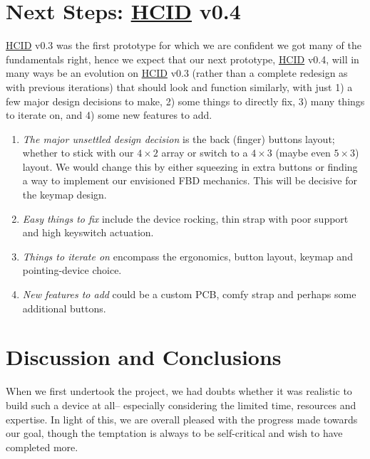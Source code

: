 \documentclass[logo,bsc,singlespacing,parskip]{infthesis}
\begin{document}
\chapter{Next Steps: \hyperref[org0c83164]{HCID} v0.4}
\label{sec:orgf0596d4}
\hyperref[org0c83164]{HCID} v0.3 was the first prototype for which we are confident we got  many of the fundamentals right, hence we expect that our next prototype,  \hyperref[org0c83164]{HCID} v0.4, will in many ways be an evolution on \hyperref[org0c83164]{HCID} v0.3 (rather than a complete redesign as with previous iterations) that should look and function similarly, with just 1) a few major design decisions to make, 2) some things to directly fix, 3) many things to iterate on, and  4) some new features to add.

\begin{enumerate}
\item \emph{The major unsettled design decision} is the back (finger) buttons layout; whether to stick with our \(4\times2\) array or switch to a \(4\times3\) (maybe even \(5\times3\)) layout.
We would change this by either squeezing in extra buttons or finding a way to implement our envisioned FBD mechanics. This will be decisive for the keymap design.

\item \emph{Easy things to fix} include the device rocking, thin strap with poor support and high keyswitch actuation.

\item \emph{Things to iterate on} encompass the ergonomics, button layout, keymap and pointing-device choice.

\item \emph{New features to add} could be a custom PCB, comfy strap and perhaps some additional buttons.
\end{enumerate}
\iffalse

\part{Conclusions}
\label{sec:orgdd435d5}
\fi
{}
\chapter*{Discussion and Conclusions}
\label{sec:org68cb77f}
When we first undertook the project, we had doubts whether it was realistic to build such a device at all-- especially considering the limited time, resources and expertise.
In light of this, we are overall pleased with the progress made towards our goal, though the temptation is always to be self-critical and wish to have completed more.
\end{document}
